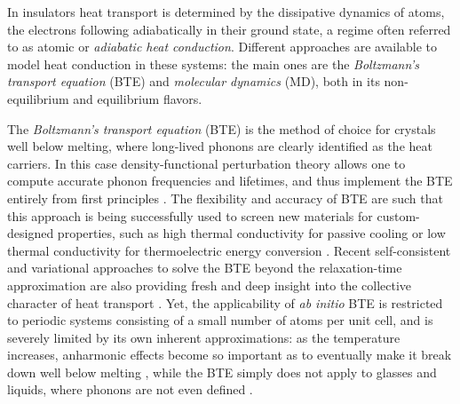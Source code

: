 In insulators heat transport is determined by the dissipative dynamics of atoms, the electrons following adiabatically in their ground state, a regime often referred to as atomic or \emph{adiabatic heat conduction}. Different approaches are available to model heat conduction in these systems: the main ones are the \emph{Boltzmann's transport equation} (BTE)  %
and \emph{molecular dynamics} (MD), both in its non-equilibrium and equilibrium flavors. 
%

The \emph{Boltzmann's transport equation} (BTE) \cite{Peierls1929,Zhou2016} is the method of choice for crystals well below melting, where long-lived phonons are clearly identified as the heat carriers. In this case density-functional perturbation theory \cite{Baroni1987a,Gonze1989,Baroni2001} allows one to compute accurate phonon frequencies \cite{Giannozzi1991} and lifetimes, \cite{Debernardi1995,Paulatto2013} and thus implement the BTE entirely from first principles \cite{Broido:2007iu}. 
The flexibility and accuracy of \abinitio BTE are such that this approach is being successfully used to screen new materials for custom-designed properties, such as high thermal conductivity for passive cooling \cite{Lindsay:2013fw,Lindsay:2013db} or low thermal conductivity for thermoelectric energy conversion \cite{PhysRevX.4.011019,Schwingen2014}. 
Recent self-consistent and variational approaches to solve the BTE beyond the relaxation-time approximation \cite{Fugallo2013} are also providing fresh and deep insight into the collective character of heat transport \cite{Fugallo2013,Lee:2015ex,Cepellotti2015,Cepellotti:2016bk}. 
Yet, the applicability of \emph{ab initio} BTE is restricted to periodic systems consisting of a small number of atoms per unit cell, and is severely limited by its own inherent approximations: as the temperature increases, anharmonic effects become so important as to eventually make it break down well below melting \cite{Turney:2009bb}, while the BTE simply does not apply to glasses and liquids, where phonons are not even defined \cite{Allen1989} . 

